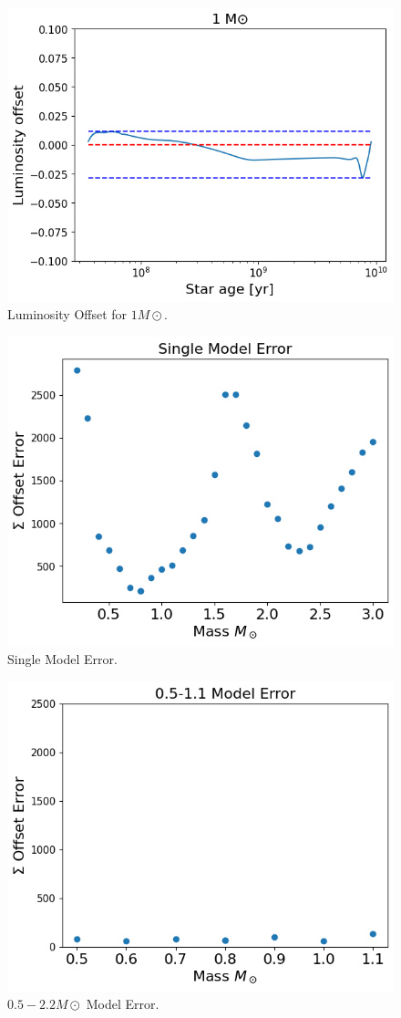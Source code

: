 \begin{figure}[H]
	\centering
	\includegraphics[width=\textwidth]{assets/error 1.png}
	\caption{Luminosity Offset for $1M\odot$.}
	\label{fig:error1}
\end{figure}
\begin{figure}[H]
	\centering
	\includegraphics[width=\textwidth]{assets/singlemodeerror.png}
	\caption{Single Model Error.}
	\label{fig:errorsingle}
\end{figure}

\begin{figure}[H]
	\centering
	\includegraphics[width=\textwidth]{assets/0.5-1.1Error.png}
	\caption{$0.5-2.2M\odot$ Model Error.}
	\label{fig:error0.5-1.1}
\end{figure}